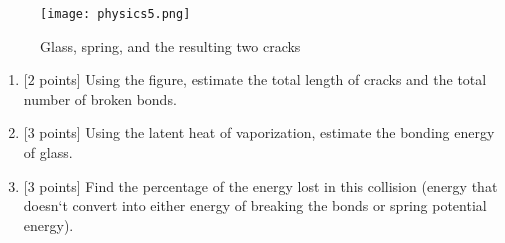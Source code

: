 \begin{enumerate}[align=left,start=1,label=\textbf{\textcolor{meared}{Problem \arabic*}}]
        \begin{figure}[!ht]
            \centering
            \texttt{[image: physics5.png]}
            \caption{Glass, spring, and the resulting two cracks}
        \end{figure}

        \begin{enumerate}
            \item {[$2$ points]} Using the figure, estimate the total length of cracks and the total number of broken bonds.
            \item {[$3$ points]} Using the latent heat of vaporization, estimate the bonding energy of glass.
            \item {[$3$ points]} Find the percentage of the energy lost in this collision (energy that doesn`t convert into either energy of breaking the bonds or spring potential energy).
        \end{enumerate}
\end{enumerate}

